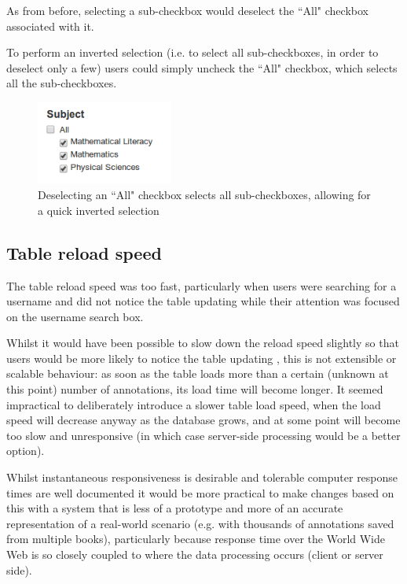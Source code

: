 As from before, selecting a sub-checkbox would deselect the ``All" checkbox associated with it. 

To perform an inverted selection (i.e. to select all sub-checkboxes, in order to deselect only a few) users could simply uncheck the ``All" checkbox, which selects all the sub-checkboxes.

\begin{figure}[h!]
    \centering
    \includegraphics[width=0.4\textwidth]{Figures/V2/deselectAll.png}
 \caption{Deselecting an ``All" checkbox selects all sub-checkboxes, allowing for a quick inverted selection}
\end{figure}


\subsection{Table reload speed}
The table reload speed was too fast, particularly when users were searching for a username and did not notice the table updating while their attention was focused on the username search box. 

Whilst it would have been possible to slow down the reload speed slightly so that users would be more likely to notice the table updating \citep[p. 282]{Shneiderman1984}, this is not extensible or scalable behaviour: as soon as the table loads more than a certain (unknown at this point) number of annotations, its load time will become longer. It seemed impractical to deliberately introduce a slower table load speed, when the load speed will decrease anyway as the database grows, and at some point will become too slow and unresponsive (in which case server-side processing would be a better option). 

Whilst instantaneous responsiveness is desirable \citep[p. 272]{DixFinlay} and tolerable computer response times are well documented \citep[p. 154]{Nah} it would be more practical to make changes based on this with a system that is less of a prototype and more of an accurate representation of a real-world scenario (e.g. with thousands of annotations saved from multiple books), particularly because response time over the World Wide Web is so closely coupled to where the data processing occurs (client or server side). 

